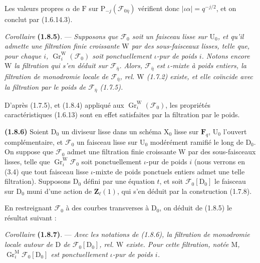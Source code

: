 \documentclass[11pt,leqno]{article}
\begin{document}
Les valeurs propres \(\alpha\) de \(\mathrm{F}\) sur \(\mathrm{P}_{-j}(\mathscr{F}_{0\bar{\eta}})\) vérifient donc \(|\iota\alpha|=q^{-j/2}\), et on conclut par (1.6.14.3).

\textit{Corollaire} \textbf{(1.8.5)}. — \textit{Supposons que \(\mathscr{F}_0\) soit un faisceau lisse sur \(\mathrm{U}_0\), et qu’il admette une filtration finie croissante \(\mathrm{W}\) par des sous-faisceaux lisses, telle que, pour chaque \(i\), \(\operatorname{Gr}_i^{\mathrm{W}}(\mathscr{F}_0)\) soit ponctuellement \(\iota\)-pur de poids \(i\). Notons encore \(\mathrm{W}\) la filtration qui s’en déduit sur \(\mathscr{F}_{\bar{\eta}}\). Alors, \(\mathscr{F}_{\bar{\eta}}\) est \(\iota\)-mixte à poids entiers, la filtration de monodromie locale de \(\mathscr{F}_{\bar{\eta}}\), rel. \(\mathrm{W}\) \textup{(1.7.2)} existe, et elle coïncide avec la filtration par le poids de \(\mathscr{F}_{\bar{\eta}}\) \textup{(1.7.5)}.}

D’après (1.7.5), et (1.8.4) appliqué aux \(\operatorname{Gr}_i^{\mathrm{W}}(\mathscr{F}_0)\), les propriétés caractéristiques (1.6.13) sont en effet satisfaites par la filtration par le poids.

\textbf{(1.8.6)} Soient \(\mathrm{D}_0\) un diviseur lisse dans un schéma \(\mathrm{X}_0\) lisse sur \(\mathbf{F}_q\), \(\mathrm{U}_0\) l’ouvert complémentaire, et \(\mathscr{F}_0\) un faisceau lisse sur \(\mathrm{U}_0\) modérément ramifié le long de \(\mathrm{D}_0\). On suppose que \(\mathscr{F}_0\) admet une filtration finie croissante \(\mathrm{W}\) par des sous-faisceaux lisses, telle que \(\operatorname{Gr}_i^{\mathrm{W}}\mathscr{F}_0\) soit ponctuellement \(\iota\)-pur de poids \(i\) (nous verrons en (3.4) que tout faisceau lisse \(\iota\)-mixte de poids ponctuels entiers admet une telle filtration). Supposons \(\mathrm{D}_0\) défini par une équation \(t\), et soit \(\mathscr{F}_0[\mathrm{D}_0]\) le faisceau sur \(\mathrm{D}_0\) muni d’une action de \(\mathbf{Z}_\ell(1)\), qui s’en déduit par la construction (1.7.8).

En restreignant \(\mathscr{F}_0\) à des courbes transverses à \(\mathrm{D}_0\), on déduit de (1.8.5) le résultat suivant :

\textit{Corollaire} \textbf{(1.8.7)}. — \textit{Avec les notations de \textup{(1.8.6)}, la filtration de monodromie locale autour de \(\mathrm{D}\) de \(\mathscr{F}_0[\mathrm{D}_0]\), rel. \(\mathrm{W}\) existe. Pour cette filtration, notée \(\mathrm{M}\), \(\operatorname{Gr}_i^{\mathrm{M}}\mathscr{F}_0[\mathrm{D}_0]\) est ponctuellement \(\iota\)-pur de poids \(i\).}
\end{document}
